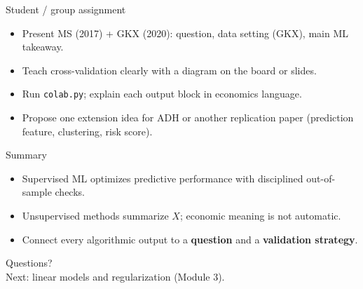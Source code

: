 \documentclass[aspectratio=169,11pt]{beamer}
\begin{document}
\begin{frame}{Student / group assignment}
  \begin{itemize}
    \item Present MS (2017) + GKX (2020): question, data setting (GKX), main ML takeaway.
    \item Teach cross-validation clearly with a diagram on the board or slides.
    \item Run \texttt{colab.py}; explain each output block in economics language.
    \item Propose one extension idea for ADH or another replication paper (prediction feature, clustering, risk score).
  \end{itemize}
\end{frame}

\begin{frame}{Summary}
  \begin{itemize}
    \item Supervised ML optimizes predictive performance with disciplined out-of-sample checks.
    \item Unsupervised methods summarize \(X\); economic meaning is not automatic.
    \item Connect every algorithmic output to a \textbf{question} and a \textbf{validation strategy}.
  \end{itemize}
\end{frame}

\begin{frame}[plain]
  \begin{center}
    \Large Questions?\\[0.8em]
    \normalsize Next: linear models and regularization (Module 3).
  \end{center}
\end{frame}
\end{document}
